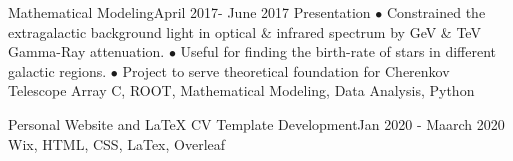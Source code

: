 \begin{projects}    
   \project
    {Mathematical Modeling}{April 2017- June 2017}
    {  {Presentation} }
    {$\bullet$ Constrained the extragalactic background light in optical \& infrared spectrum by GeV \& TeV Gamma-Ray attenuation. $\bullet$ Useful for finding the birth-rate of stars in different galactic regions. $\bullet$ Project to serve theoretical foundation for Cherenkov Telescope Array}
    {C, ROOT, Mathematical Modeling, Data Analysis, Python}
\end{projects}
\vspace{-5ex}
\begin{projects}    
   \project   
    {Personal Website and LaTeX CV Template Development}{Jan 2020 - Maarch 2020}
    { }
    {\vspace*{-10px}}
    {Wix, HTML, CSS, LaTex, Overleaf}
\end{projects}